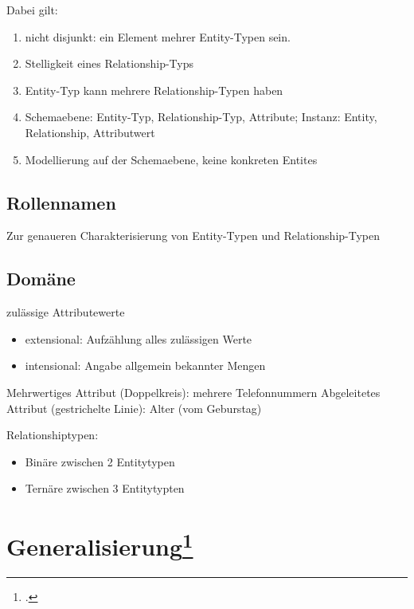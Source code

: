 \documentclass{bschlangaul-theorie}
\begin{document}
Dabei gilt:

\begin{enumerate}
\def\labelenumi{\arabic{enumi}.}
\item nicht disjunkt: ein Element mehrer Entity-Typen sein.
\item Stelligkeit eines Relationship-Typs
\item Entity-Typ kann mehrere Relationship-Typen haben
\item Schemaebene: Entity-Typ, Relationship-Typ, Attribute; Instanz: Entity,
Relationship, Attributwert
\item Modellierung auf der Schemaebene, keine konkreten Entites
\end{enumerate}

\subsection{Rollennamen}

Zur genaueren Charakterisierung von Entity-Typen und Relationship-Typen

\subsection{Domäne}

zulässige Attributewerte

\begin{itemize}
\item extensional: Aufzählung alles zulässigen Werte
\item intensional: Angabe allgemein bekannter Mengen
\end{itemize}

Mehrwertiges Attribut (Doppelkreis): mehrere Telefonnummern
Abgeleitetes Attribut (gestrichelte Linie): Alter (vom Geburstag)

Relationshiptypen:

\begin{itemize}
\item Binäre zwischen 2 Entitytypen
\item Ternäre zwischen 3 Entitytypten
\end{itemize}

%

\section{Generalisierung\footcite[Seite 27]{db:fs:1}}
\end{document}
